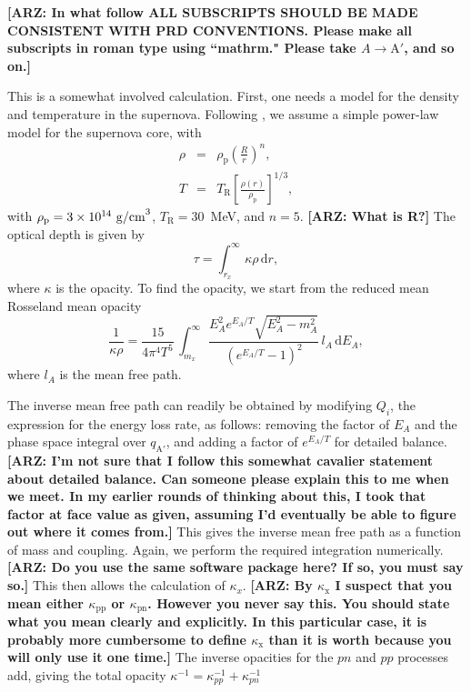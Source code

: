 \documentclass[nofootinbib,prd,superscriptaddress,twocolumn]{revtex4}
\newcommand{\beq}{\begin{equation}}
\newcommand{\eeq}{\end{equation}}
\newcommand{\bea}{\begin{eqnarray}}
\newcommand{\eea}{\end{eqnarray}}
\newcommand{\qa}{q_{\mathrm{A}'}}
\newcommand{\Aprime}{\mathrm{A}'}
\newcommand{\dd}{\mathrm{d}}
\newcommand{\arz}[1]{{{\bf{\color{BrickRed}[ARZ: #1]}}}}
\begin{document}
\arz{In what follow ALL SUBSCRIPTS SHOULD BE MADE CONSISTENT WITH PRD CONVENTIONS. Please 
make all subscripts in roman type using ``mathrm." Please take $A \rightarrow \Aprime$, and so on.}

This is a somewhat involved calculation. First, one needs a model for 
the density and temperature in the supernova. Following \cite{turner88}, 
we assume a simple power-law model for the supernova core, with 
\bea
\rho &=& \rho_{\mathrm{p}} \left( \frac{R}{r}\right )^n,\\
T &=& T_{\mathrm{R}} \left[ \frac{\rho(r)}{\rho_{\mathrm{p}}} \right]^{1/3},
\eea
with $  \rho_{\mathrm{p}}  = 3\times10^{14}\ {\rm g/cm}^3$, $T_{\mathrm{R}} = 30$~MeV, 
and $n = 5$. \arz{What is R?}
The optical depth is given by 
\beq
\tau = \int_{r_x}^{\infty}\, \kappa \rho\,  \dd r,
\eeq
where $ \kappa$ is the opacity.  To find the opacity, we start from the reduced mean 
Rosseland mean opacity 
\beq
\frac{1}{\kappa \rho} = 
\frac{15}{4 \pi^4 T^5}\, \int_{m_x}^{\infty}\, \frac{E_A^2 e^{E_A/T} \sqrt{E_A^2 - m_A^2}}{(e^{E_A/T}-1)^2}\, l_A\, \dd E_A,
\eeq
where $ l_A $ is the mean free path. 


The inverse mean free path can readily be obtained by modifying $ Q_i $, 
the expression for the energy loss rate, as follows: removing the factor of $ E_A $ 
and the phase space integral over $ \qa $, and adding a factor of $ e^{E_A/T} $ for detailed balance. 
\arz{I'm not sure that I follow this somewhat cavalier statement about detailed balance. Can someone 
please explain this to me when we meet. In my earlier rounds of thinking about this, I took that factor 
at face value as given, assuming I'd eventually be able to figure out where it comes from.} 
This gives the inverse mean free path as a function of mass and coupling. 
Again, we perform the required integration numerically. \arz{Do you use the same software package here? 
If so, you must say so.} 
This then allows the calculation of $ \kappa_x $. 
\arz{By $\kappa_{\mathrm{x}}$ I suspect that you mean either $\kappa_{\mathrm{pp}}$ or 
$\kappa_{\mathrm{pn}}$. However you never say this. You should state what you mean clearly and explicitly.  
In this particular case, it is probably more cumbersome to define $\kappa_{\mathrm{x}}$ than it is worth because you 
will only use it one time.} 
The inverse opacities for the $pn$ and $pp$ processes add, 
giving the total opacity $ \kappa^{-1} = \kappa_{pp}^{-1} + \kappa_{pn}^{-1} $
\end{document}
